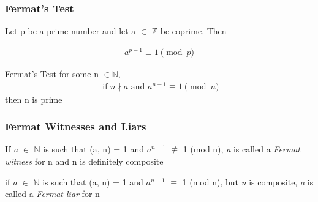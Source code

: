 \documentclass{beamer}
\begin{document}
\begin{frame}
\frametitle{Fermat's Test}
\begin{theorem}
    Let p be a prime number and let a $\in$ $\mathbb{Z}$ be coprime. Then 
    
    \begin{align*}
        a^{p-1} \equiv 1 \pmod p
    \end{align*}
\end{theorem}

\begin{block}{Fermat's Test}
    for some n $\in \mathbb{N}$, 
    \begin{align*}
        \text{ if } n \nmid a \text{ and } a^{n-1} \equiv 1 \pmod n 
    \end{align*}
    then n is prime
\end{block}
\end{frame}

\begin{frame}
\frametitle{Fermat Witnesses and Liars}
    \begin{definition}
        If \textit{a} $\in$ $\mathbb{N}$ is such that (a, n) = 1 and $a^{n-1}$ $\not\equiv$ 1 (mod n), \textit{a} is called a \textit{Fermat witness} for n and n is definitely composite
    \end{definition}
    \begin{definition}
        if \textit{a} $\in$ $\mathbb{N}$ is such that (a, n) = 1 and $a^{n-1}$ $\equiv$ 1 (mod n), but \textit{n} is composite, \textit{a} is called a \textit{Fermat liar} for n 
    \end{definition}
\end{frame}
\end{document}
